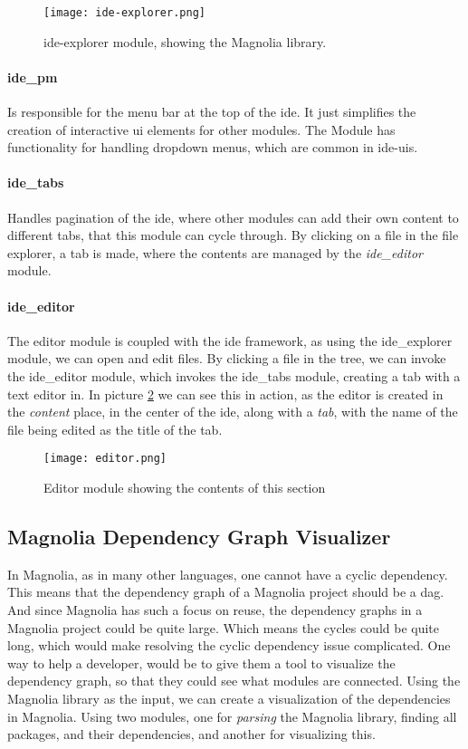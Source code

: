 \begin{figure}[H]
  \centering
  \texttt{[image: ide-explorer.png]}
  \caption{
    \gls*{ide}-explorer module, showing the Magnolia library.
  }
  \label{pic:ideEx}
\end{figure}


\paragraph{ide\_pm} Is responsible for the menu bar at the top of the
\gls*{ide}. It just simplifies the creation of interactive \gls*{ui} elements
for other modules. The Module has functionality for handling dropdown menus,
which are common in \gls*{ide}-\gls*{ui}s.

\paragraph{ide\_tabs} Handles pagination of the \gls*{ide}, where other modules
can add their own content to different tabs, that this module can cycle through.
By clicking on a file in the file explorer, a tab is made, where the contents
are managed by the \textit{ide\_editor} module.

\paragraph{ide\_editor} The editor module is coupled with the \gls*{ide}
framework, as using the ide\_explorer module, we can open and edit files. By
clicking a file in the tree, we can invoke the ide\_editor module, which invokes
the ide\_tabs module, creating a tab with a text editor in. In picture
\ref{pic:editorModule} we can see this in action, as the editor is created in
the \textit{content} place, in the center of the \gls*{ide}, along with a
\textit{tab}, with the name of the file being edited as the title of the tab.

\begin{figure}[H]
  \centering
  \texttt{[image: editor.png]}
  \caption{
    Editor module showing the contents of this section
  }
  \label{pic:editorModule}
\end{figure}


\subsection{Magnolia Dependency Graph Visualizer}

In Magnolia, as in many other languages, one cannot have a cyclic dependency.
This means that the dependency graph of a Magnolia project should be a
\gls*{dag}. And since Magnolia has such a focus on reuse, the dependency graphs
in a Magnolia project could be quite large. Which means the cycles could be
quite long, which would make resolving the cyclic dependency issue complicated.
One way to help a developer, would be to give them a tool to visualize the
dependency graph, so that they could see what modules are connected. Using the
Magnolia library as the input, we can create a visualization of the dependencies
in Magnolia. Using two modules, one for \textit{parsing} the Magnolia library,
finding all packages, and their dependencies, and another for visualizing
this.


